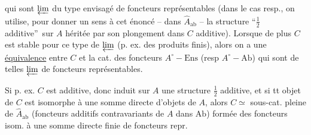 
qui sont $\varprojlim$ du type envisagé de foncteurs représentables (dans le cas resp., on utilise, pour  donner un sens à cet énoncé -- dans $\widehat A_{\mathrm{ab}}$ -- la structure \textquotedblleft$\frac12$ additive\textquotedblright\ sur $A$ héritée par son plongement dans $C$ additive). Lorsque de plus $C$ est stable pour ce type de $\varprojlim$ (p. ex. des produits finis), alors on a  une \uline{équivalence} entre $C$ et la cat. des foncteurs $A^\circ\mathrel{-}\mathrm{Ens}$ (resp $A^\circ\mathrel{-}\mathrm{Ab}$) qui sont de telles $\varprojlim$ de foncteurs représentables.


Si p. ex. $C$ est additive, donc  induit sur $A$ une structure $\frac12$ additive, et si tt objet de $C$ est isomorphe à une somme directe  d'objets de $A$, alors $C\simeq$ sous-cat. pleine de $\widehat A_{\mathrm{ab}}$ (foncteurs additifs contravariants de $A$ dans $\mathrm{Ab}$) formée  des foncteurs isom. à une somme directe finie de foncteurs repr.

